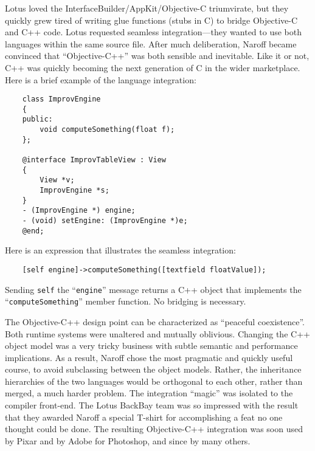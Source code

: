 \documentclass[acmsmall]{acmart}\settopmatter{}
\begin{document}
Lotus loved the InterfaceBuilder/AppKit/Objective-C triumvirate, but they quickly grew tired of writing glue functions (stubs in C) to bridge Objective-C and C++ code. Lotus requested seamless integration---they wanted to use both languages within the same source file. After much deliberation, Naroff became convinced that ``Objective-C++'' was both sensible and inevitable. Like it or not, C++ was quickly becoming the next generation of C in the wider marketplace. Here is a brief example of the language integration:
\begin{verbatim}
    class ImprovEngine 
    {
    public:
        void computeSomething(float f);
    };

    @interface ImprovTableView : View
    {
        View *v;
        ImprovEngine *s; 
    }
    - (ImprovEngine *) engine; 
    - (void) setEngine: (ImprovEngine *)e; 
    @end;
\end{verbatim}
Here is an expression that illustrates the seamless integration:
\begin{verbatim}
    [self engine]->computeSomething([textfield floatValue]);
\end{verbatim}
Sending \verb$self$ the ``\verb$engine$'' message returns a C++ object that implements the ``\verb$computeSomething$'' member function. No bridging is necessary.

The Objective-C++ design point can be characterized as ``peaceful coexistence''. Both runtime systems were unaltered and mutually oblivious. Changing the C++ object model was a very tricky business with subtle semantic and performance implications. As a result, Naroff chose the most pragmatic and quickly useful course, to avoid subclassing between the object models. Rather, the inheritance hierarchies of the two languages would be orthogonal to each other, rather than merged, a much harder problem. The integration ``magic'' was isolated to the compiler front-end. The Lotus BackBay team was so impressed with the result that they awarded Naroff a special T-shirt for accomplishing a feat no one thought could be done. The resulting Objective-C++ integration was soon used by Pixar and by Adobe for Photoshop, and since by many others.
\end{document}
